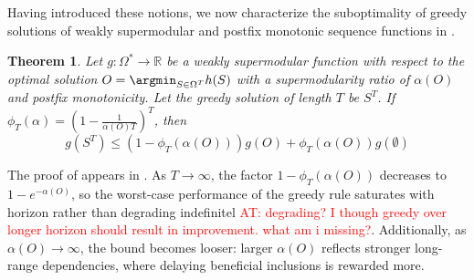 \documentclass{article} %
\newtheorem{theorem}{Theorem}[section]
\newcommand\ambuj[1]{\textcolor{red}{AT: #1}}
\begin{document}


Having introduced these notions, we now characterize the suboptimality of greedy solutions of weakly supermodular and 
postfix monotonic sequence functions in .
\begin{theorem} \label{th:suboptgreedy}
    Let $g: \Omega^* \to \mathbb{R}$ be a weakly supermodular function with respect to the optimal solution $O = \argmin_{S \in \Omega^T} h(S)$ with a supermodularity ratio of $\alpha(O)$ and 
    postfix monotonicity. Let the greedy solution of length $T$ be $S^T$. If $\phi_T(\alpha) =  \left(1 - \frac{1}{\alpha(O) T}\right)^T$, then
    \begin{equation*}
        g(S^T) \leq  \left(1 - \phi_T(\alpha(O))\right)
        g(O) +  \phi_T(\alpha(O))g(\emptyset)
    \end{equation*}
\end{theorem}

The proof of  appears in . As $T \to \infty$, the factor $1 - \phi_T(\alpha(O))$ 
decreases to $1 - e^{-\alpha(O)}$, so the worst-case performance of the greedy rule saturates with horizon rather than degrading indefinitel \ambuj{degrading? I though greedy over longer horizon should result in improvement. what am i missing?}. Additionally, as $\alpha(O) \to\infty$, the bound becomes looser: larger $\alpha(O)$ reflects stronger long-range dependencies, where delaying beneficial inclusions is rewarded more.
\end{document}
